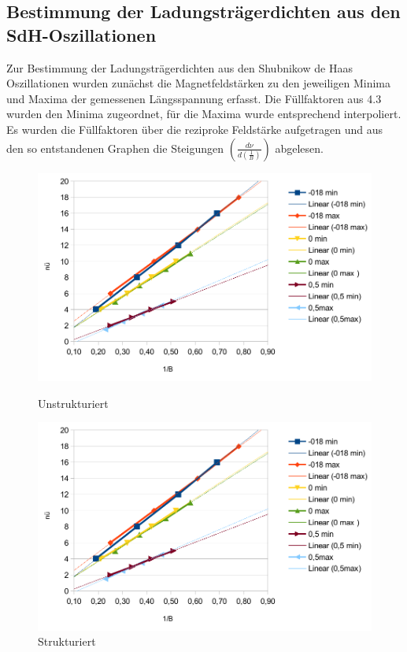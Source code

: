 \documentclass[10pt,a4paper]{article}
\begin{document}
	\subsection{Bestimmung der Ladungsträgerdichten aus den SdH-Oszillationen}
	Zur Bestimmung der Ladungsträgerdichten aus den Shubnikow de Haas Oszillationen wurden zunächst die Magnetfeldstärken zu den jeweiligen Minima und Maxima der gemessenen Längsspannung erfasst. Die Füllfaktoren aus 4.3 wurden den Minima zugeordnet, für die Maxima wurde entsprechend interpoliert.\\
	 Es wurden die Füllfaktoren über die reziproke Feldstärke aufgetragen und aus den so entstandenen Graphen die Steigungen $ (\frac{d\nu}{d\left(\frac{1}{B}\right)}) $ abgelesen.
	
	\begin{figure}[H]
  		\begin{minipage}[b]{5 cm}
  	 
   			 \includegraphics [scale=0.5]{Diagramm441_cropped.pdf} 
   			 \caption{Unstrukturiert} 
  		\end{minipage}
  		\begin{minipage}[b]{5 cm}
    		\includegraphics [scale=0.5]{Diagramm441_cropped.pdf}
    		\caption{Strukturiert}  
  		\end{minipage}
	 \end{figure}
	 
\end{document}
